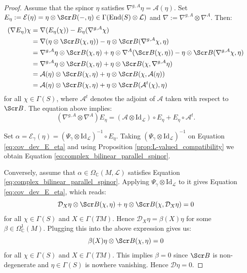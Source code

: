 \documentclass[10pt,a4paper,twoside,reqno]{amsart}
\theoremstyle{plain}
\theoremstyle{definition}
\theoremstyle{remark}
\newcommand{\End}{\mathrm{End}}
\def\C{\mathbb{C}}
\def\Id{\mathrm{Id}}
\def\scB{\Scr B}
\def\cD{\mathcal{D}}
\def\cA{\mathcal{A}}
\def\cE{\mathcal{E}}
\def\cL{\mathcal{L}}
\begin{document}
\begin{proof}
    Assume that the spinor $\eta$ satisfies $\nabla^{g,A}\eta=\cA(\eta)$. Set $E_\eta:=\cE(\eta)=\eta\otimes\scB(-,\eta)\in\Gamma(\End(S)\otimes\cL)$ and $\nabla:=\nabla^{g,A}\otimes\nabla^{A}$. Then: \begin{align*}
        (\nabla E_\eta)\chi&=\nabla(E_\eta(\chi))-E_\eta(\nabla^{g,A}\chi)\\
        &=\nabla(\eta\otimes\scB(\chi,\eta))-\eta\otimes\scB(\nabla^{g,A}\chi,\eta)\\
        &=\nabla^{g,A}\eta\otimes\scB(\chi,\eta)+\eta\otimes\nabla^{A}(\scB(\chi,\eta))-\eta\otimes\scB(\nabla^{g,A}\chi,\eta)\\
        &=\nabla^{g,A}\eta\otimes\scB(\chi,\eta)+\eta\otimes\scB(\chi,\nabla^{g,A}\eta)\\
        &=\cA(\eta)\otimes\scB(\chi,\eta)+\eta\otimes\scB(\chi,\cA(\eta))\\
        &=\cA(\eta)\otimes\scB(\chi,\eta)+\eta\otimes\scB(\cA^t(\chi),\eta)
    \end{align*} for all $\chi\in\Gamma(S)$, where $\cA^t$ denotes the adjoint of $\cA$ taken with respect to $\scB$. The equation above implies: \begin{equation}\label{eq:cov_dev_E_eta}
        (\nabla^{g,A}\otimes\nabla^{A})E_\eta=(\cA\otimes\Id_{\cL})\circ E_\eta+E_\eta\circ\cA^t.
    \end{equation}
    
    Set $\alpha=\cE_\gamma(\eta)=(\Psi_\gamma\otimes\Id_{\cL})^{-1}\circ E_\eta$. Taking $(\Psi_\gamma\otimes\Id_{\cL})^{-1}$ on Equation \eqref{eq:cov_dev_E_eta} and using Proposition \ref{prop:L-valued_compatibility} we obtain Equation \eqref{eq:complex_bilinear_parallel_spinor}.\medskip
    
    Conversely, assume that $\alpha\in\Omega_\C(M,\cL)$ satisfies Equation \eqref{eq:complex_bilinear_parallel_spinor}. Applying $\Psi_\gamma\otimes\Id_{\cL}$ to it gives Equation \eqref{eq:cov_dev_E_eta}, which reads: $$\cD_X\eta\otimes\scB(\chi,\eta)+\eta\otimes\scB(\chi,\cD_X\eta)=0$$ for all $\chi\in\Gamma(S)$ and $X\in\Gamma(TM)$. Hence $\cD_X\eta=\beta(X)\eta$ for some $\beta\in\Omega^1_\C(M)$. Plugging this into the above expression gives us: $$\beta(X)\eta\otimes\scB(\chi,\eta)=0$$ for all $\chi\in\Gamma(S)$ and $X\in\Gamma(TM)$. This implies $\beta=0$ since $\scB$ is non-degenerate and $\eta\in\Gamma(S)$ is nowhere vanishing. Hence $\cD\eta=0$.
\end{proof}
\end{document}
